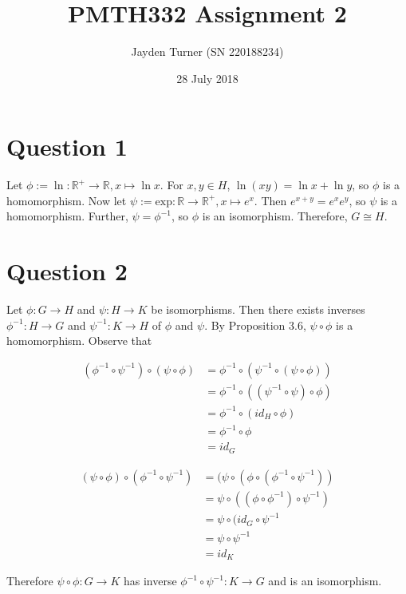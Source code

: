 \documentclass{article}
\title{PMTH332 Assignment 2}
\date{28 July 2018}
\author{Jayden Turner (SN 220188234)}
\begin{document}
\maketitle
{}

\section*{Question 1}

Let $\phi := \ln:\mathbb{R}^+ \rightarrow \mathbb{R}, x \mapsto \ln x$. For $x, y \in H$, $\ln(xy) = \ln x + \ln y$, so $\phi$ is a homomorphism.
Now let $\psi := \text{exp}:\mathbb{R} \rightarrow \mathbb{R}^+, x \mapsto e^x$. Then $e^{x + y} = e^x e^y$, so $\psi$ is a homomorphism. Further,
$\psi = \phi^{-1}$, so $\phi$ is an isomorphism. Therefore, $G \cong H$.

\section*{Question 2}

Let $\phi: G \rightarrow H$ and $\psi: H \rightarrow K$ be isomorphisms. Then there exists inverses $\phi^{-1}: H \rightarrow G$ and $\psi^{-1}: K \rightarrow H$
of $\phi$ and $\psi$. By Proposition 3.6, $\psi \circ \phi$ is a homomorphism. Observe that

\begin{align*}
    (\phi^{-1} \circ \psi^{-1}) \circ (\psi \circ \phi) &= \phi^{-1} \circ (\psi^{-1} \circ (\psi \circ \phi))\\
    &= \phi^{-1} \circ((\psi^{-1} \circ \psi) \circ \phi)\\
    &= \phi^{-1} \circ(id_H \circ \phi)\\
    &= \phi^{-1} \circ \phi\\
    &= id_G
\end{align*}

\begin{align*}
    (\psi \circ \phi) \circ (\phi^{-1} \circ \psi^{-1}) &= (\psi \circ (\phi \circ (\phi^{-1} \circ \psi^{-1}))\\
    &= \psi \circ ((\phi \circ \phi^{-1}) \circ \psi^{-1})\\
    &= \psi \circ (id_G \circ \psi^{-1}\\
    &= \psi \circ \psi^{-1}\\
    &= id_K
\end{align*}

Therefore $\psi \circ \phi: G \rightarrow K$ has inverse $\phi^{-1} \circ \psi^{-1}: K \rightarrow G$ and is an isomorphism.
\end{document}
